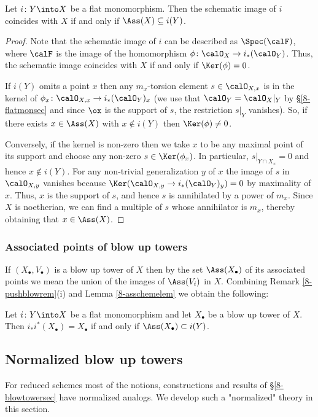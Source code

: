 \documentclass[10pt]{../fichiers-configuration-latex/smfart}
\begin{document}
\begin{lemma2}\label{8-asschemelem} Let $i{\colon}Y\into X$ be
a flat monomorphism. Then the schematic image of $i$ coincides
with $X$ if and only if $\Ass(X)\subseteq i(Y)$.  \end{lemma2}
\begin{proof} Note that the schematic image of $i$ can be described
as $\Spec(\calF)$, where $\calF$ is the image of the homomorphism
$\phi{\colon}\calO_X\to i_*(\calO_Y)$. Thus, the schematic image
coincides with $X$ if and only if $\Ker(\phi)=0$.

If $i(Y)$ omits a point $x$ then any $m_x$-torsion element
$s\in\calO_{X,x}$ is in the kernel of $\phi_x{\colon}\calO_{X,x}\to
i_*(\calO_Y)_x$ (we use that $\calO_Y=\calO_X|_Y$ by
\S\ref{8-flatmonsec} and since $\ox$ is the support of $s$, the
restriction $s|_Y$ vanishes). So, if there exists $x\in\Ass(X)$
with $x\notin i(Y)$ then $\Ker(\phi)\neq 0$.

Conversely, if the kernel is non-zero then we take $x$ to
be any maximal point of its support and choose any non-zero
$s\in\Ker(\phi_x)$. In particular, $s|_{Y\cap X_x}=0$ and hence
$x\notin i(Y)$. For any non-trivial generalization $y$ of $x$ the
image of $s$ in $\calO_{X,y}$ vanishes because $\Ker(\calO_{X,y}\to
i_*(\calO_Y)_y)=0$ by maximality of $x$. Thus, $x$ is the support
of $s$, and hence $s$ is annihilated by a power of $m_x$. Since $X$
is noetherian, we can find a multiple of $s$ whose annihilator is
$m_x$, thereby obtaining that $x\in\Ass(X)$.  \end{proof}

\subsubsection{Associated points of blow up
towers}\label{8-astowersec} If $(X_\bullet,V_\bullet)$ is a blow up tower
of $X$ then by the set $\Ass(X_\bullet)$ of its associated points
we mean the union of the images of $\Ass(V_i)$ in $X$. Combining
Remark \ref{8-pushblowrem}(i) and Lemma \ref{8-asschemelem} we
obtain the following:

\begin{lemma2}\label{8-astowerlem} Let $i{\colon}Y\into X$ be a
flat monomorphism and let $X_\bullet$ be a blow up tower of $X$. Then
$i_*i^*(X_\bullet)=X_\bullet$ if and only if $\Ass(X_\bullet)\subset i(Y)$.
\end{lemma2}

\subsection{Normalized blow up towers}\label{8-normaltowersec} For
reduced schemes most of the notions, constructions and results of
\S\ref{8-blowtowersec} have normalized analogs. We develop such a
"normalized" theory in this section.
\end{document}
